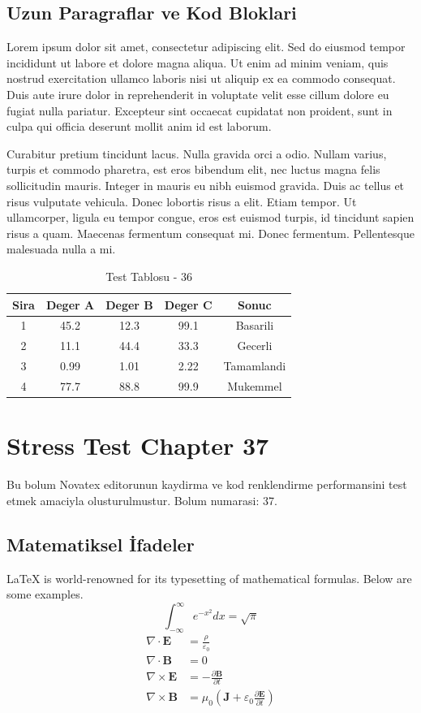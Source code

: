 \documentclass[12pt,a4paper]{article}
\begin{document}
\subsection{Uzun Paragraflar ve Kod Bloklari}
Lorem ipsum dolor sit amet, consectetur adipiscing elit. Sed do eiusmod tempor incididunt ut labore et dolore magna aliqua. Ut enim ad minim veniam, quis nostrud exercitation ullamco laboris nisi ut aliquip ex ea commodo consequat. Duis aute irure dolor in reprehenderit in voluptate velit esse cillum dolore eu fugiat nulla pariatur. Excepteur sint occaecat cupidatat non proident, sunt in culpa qui officia deserunt mollit anim id est laborum.

Curabitur pretium tincidunt lacus. Nulla gravida orci a odio. Nullam varius, turpis et commodo pharetra, est eros bibendum elit, nec luctus magna felis sollicitudin mauris. Integer in mauris eu nibh euismod gravida. Duis ac tellus et risus vulputate vehicula. Donec lobortis risus a elit. Etiam tempor. Ut ullamcorper, ligula eu tempor congue, eros est euismod turpis, id tincidunt sapien risus a quam. Maecenas fermentum consequat mi. Donec fermentum. Pellentesque malesuada nulla a mi.

\begin{table}[h!]
\centering
\begin{tabular}{|c|c|c|c|c|}
\hline
\textbf{Sira} & \textbf{Deger A} & \textbf{Deger B} & \textbf{Deger C} & \textbf{Sonuc} \\
\hline
1 & 45.2 & 12.3 & 99.1 & Basarili \\
2 & 11.1 & 44.4 & 33.3 & Gecerli \\
3 & 0.99 & 1.01 & 2.22 & Tamamlandi \\
4 & 77.7 & 88.8 & 99.9 & Mukemmel \\
\hline
\end{tabular}
\caption{Test Tablosu - 36}
\end{table}

\newpage
\section{Stress Test Chapter 37}
Bu bolum Novatex editorunun kaydirma ve kod renklendirme performansini test etmek amaciyla olusturulmustur. Bolum numarasi: 37.

\subsection{Matematiksel İfadeler}
\LaTeX{} is world-renowned for its typesetting of mathematical formulas. Below are some examples.
\begin{equation}
\int_{-\infty}^{\infty} e^{-x^2} dx = \sqrt{\pi}
\end{equation}
\begin{align}
\nabla \cdot \mathbf{E} &= \frac{\rho}{\varepsilon_0} \\
\nabla \cdot \mathbf{B} &= 0 \\
\nabla \times \mathbf{E} &= -\frac{\partial \mathbf{B}}{\partial t} \\
\nabla \times \mathbf{B} &= \mu_0\left(\mathbf{J} + \varepsilon_0 \frac{\partial \mathbf{E}}{\partial t}\right)
\end{align}
\end{document}
